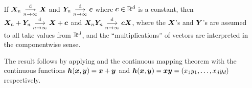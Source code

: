 \begin{enumerate}
\begin{theorem}
\label{thm:slutsky}
If \(\bm{X}_n\underset{n\to\infty}{\overset{\text{d}}{\longrightarrow}}\bm{X}\) and \(\bm{Y}_n\underset{n\to\infty}{\overset{\text{d}}{\longrightarrow}}\bm{c}\) where
\(\bm{c}\in\mathbb{R}^d\) is a constant, then \(\bm{X}_n+\bm{Y}_n\underset{n\to\infty}{\overset{\text{d}}{\longrightarrow}}
\bm{X}+\bm{c}\) and \(\bm{X}_n\bm{Y}_n\underset{n\to\infty}{\overset{\text{d}}{\longrightarrow}} \bm{c}\bm{X}\), where
the \(\bm{X}\)'s and \(\bm{Y}\)'s are assumed to all take values from
\(\mathbb{R}^d\), and the ``multiplications'' of vectors are interpreted in
the componentwise sense.
\end{theorem}
\begin{pf}
The result follows by applying  and the continuous
mapping theorem with the continuous functions
\(\bm{h}(\bm{x},\bm{y})=\bm{x}+\bm{y}\) and
\(\bm{h}(\bm{x},\bm{y})=\bm{x}\bm{y}=(x_1y_1,\dotsc,x_dy_d)\)
respectively.
\end{pf}
\end{enumerate}
